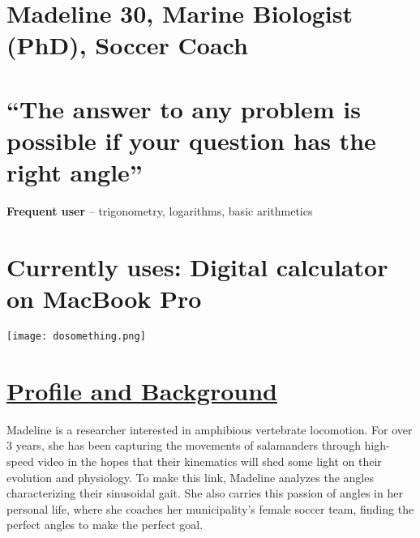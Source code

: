 \documentclass{article}
\begin{document}
\section*{\textbf{\huge Madeline}   \small  30, Marine Biologist (PhD), Soccer Coach}

\date{}


\section*{\small{“The answer to any problem is possible if your question has the right angle”}}
\bigskip
\textbf{Frequent user}  -- trigonometry, logarithms, basic arithmetics

\section*{\small Currently uses: Digital calculator on MacBook Pro}



\noindent\begin{minipage}{0.6\textwidth}%
\texttt{[image: dosomething.png]}
\end{minipage}%
\hfill%
\begin{minipage}{0.35\textwidth}\raggedright
\section*{\textbf{\underline{Profile and Background}}}
\begin{spacing}{1.5}

Madeline is a researcher interested in amphibious vertebrate locomotion.  For over 3 years, she has been capturing the movements of salamanders through high-speed video in the hopes that their kinematics will shed some light on their evolution and physiology. To make this link, Madeline analyzes the angles characterizing their sinusoidal gait. She also carries this passion of angles in her personal life, where she coaches her municipality’s female soccer team, finding the perfect angles to make the perfect goal.

\end{spacing}


\end{minipage}








 
\end{document}
